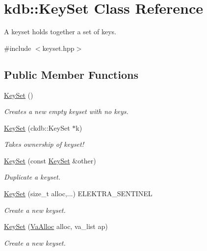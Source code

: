 \hypertarget{classkdb_1_1KeySet}{}\section{kdb\+::Key\+Set Class Reference}
\label{classkdb_1_1KeySet}


A keyset holds together a set of keys.  




{\ttfamily \#include $<$keyset.\+hpp$>$}

\subsection*{Public Member Functions}
\begin{DoxyCompactItemize}
\item 
\mbox{\hyperlink{classkdb_1_1KeySet_a4eac9850fa4f06c07a5306befc3e4377}{Key\+Set}} ()
\begin{DoxyCompactList}\small\item\em Creates a new empty keyset with no keys. \end{DoxyCompactList}\item 
\mbox{\hyperlink{classkdb_1_1KeySet_a21f651ff310178951402038e590743e0}{Key\+Set}} (ckdb\+::\+Key\+Set $\ast$k)
\begin{DoxyCompactList}\small\item\em Takes ownership of keyset! \end{DoxyCompactList}\item 
\mbox{\hyperlink{classkdb_1_1KeySet_ad8d6df839ab852fded1739ff3398d0b1}{Key\+Set}} (const \mbox{\hyperlink{classkdb_1_1KeySet}{Key\+Set}} \&other)
\begin{DoxyCompactList}\small\item\em Duplicate a keyset. \end{DoxyCompactList}\item 
\mbox{\hyperlink{classkdb_1_1KeySet_a6191e93cdd67bbca63df934498d191ba}{Key\+Set}} (size\+\_\+t alloc,...) E\+L\+E\+K\+T\+R\+A\+\_\+\+S\+E\+N\+T\+I\+N\+EL
\begin{DoxyCompactList}\small\item\em Create a new keyset. \end{DoxyCompactList}\item 
\mbox{\hyperlink{classkdb_1_1KeySet_ae0b2996803b9c9124cf791a1d738855c}{Key\+Set}} (\mbox{\hyperlink{structkdb_1_1VaAlloc}{Va\+Alloc}} alloc, va\+\_\+list ap)
\begin{DoxyCompactList}\small\item\em Create a new keyset. \end{DoxyCompactList}\item 

\end{DoxyCompactItemize}
